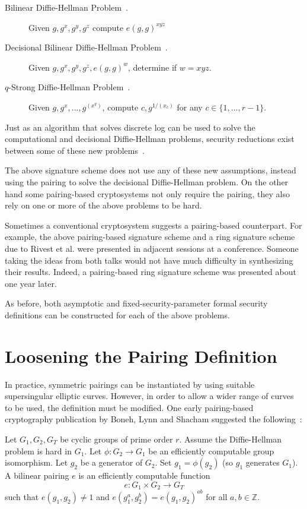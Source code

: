 \begin{description}
\item [Bilinear Diffie-Hellman Problem~\cite{bf,j}.]
Given $g,g^x,g^y,g^z$ compute $e(g,g)^{xyz}$
\item [Decisional Bilinear Diffie-Hellman Problem~\cite{bf}.]
Given $g,g^x,g^y,g^z,e(g,g)^w$, determine if $w = x y z$.
\item [$q$-Strong Diffie-Hellman Problem~\cite{bbshort}.]
Given $g,g^x,...,g^{(x^q)}$, compute $c, g^{1/(x_c)}$
for any $c\in\{1,...,r-1\}$.
\end{description}

Just as an algorithm that solves discrete log can be used to solve
the computational and decisional Diffie-Hellman problems, security reductions
exist between some of these new problems~\cite{jouxsurvey}.

The above signature scheme does not use any of these new assumptions,
instead using the pairing to solve the decisional Diffie-Hellman problem.
On the other hand some pairing-based cryptosystems not only require the
pairing, they also rely on one or more of the above problems to be hard.

Sometimes a conventional cryptosystem suggests
a pairing-based counterpart. For example,
the above pairing-based signature scheme and a ring signature scheme
due to Rivest et al. \cite{rst} were presented in adjacent sessions
at a conference. Someone taking the ideas from both talks would not have much
difficulty in synthesizing their results. Indeed,
a pairing-based ring signature scheme was presented about one
year later\cite{bgls}.

As before, both asymptotic and fixed-security-parameter formal security
definitions can be constructed for each of the above problems.

\section{\label{sec:asymmetricpairing}Loosening the Pairing Definition}

In practice, symmetric pairings can be instantiated by
using suitable supersingular elliptic curves.
However, in order to allow a wider range of curves to be used,
the definition must be modified. One early pairing-based cryptography
publication by Boneh, Lynn and Shacham
suggested the following~\cite{bls}:

Let $G_1, G_2, G_T$ be cyclic groups of prime order $r$.
Assume the Diffie-Hellman problem is hard in $G_1$.
Let $\phi : G_2 \rightarrow G_1$ be an efficiently computable group
isomorphism. Let $g_2$ be a generator of $G_2$.
Set $g_1 = \phi(g_2)$ (so $g_1$ generates $G_1$). 
A bilinear pairing $e$ is an efficiently computable function
\[
e:G_1 \times G_2 \rightarrow G_T
\]
such that $e(g_1,g_2) \ne 1$ and
$e(g_1^a, g_2^b) = e(g_1,g_2)^{a b}$ for all $a, b \in \mathbb{Z}$.

